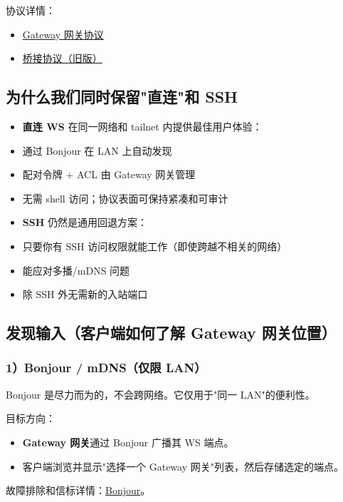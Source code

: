 协议详情：

\begin{itemize}
  \item \href{/gateway/protocol}{Gateway 网关协议}
  \item \href{/gateway/bridge-protocol}{桥接协议（旧版）}
\end{itemize}


\subsection{为什么我们同时保留"直连"和 SSH}


\begin{itemize}
  \item \textbf{直连 WS} 在同一网络和 tailnet 内提供最佳用户体验：
  \item 通过 Bonjour 在 LAN 上自动发现
  \item 配对令牌 + ACL 由 Gateway 网关管理
  \item 无需 shell 访问；协议表面可保持紧凑和可审计
  \item \textbf{SSH} 仍然是通用回退方案：
  \item 只要你有 SSH 访问权限就能工作（即使跨越不相关的网络）
  \item 能应对多播/mDNS 问题
  \item 除 SSH 外无需新的入站端口
\end{itemize}


\subsection{发现输入（客户端如何了解 Gateway 网关位置）}


\subsubsection{1）Bonjour / mDNS（仅限 LAN）}


Bonjour 是尽力而为的，不会跨网络。它仅用于"同一 LAN"的便利性。

目标方向：

\begin{itemize}
  \item \textbf{Gateway 网关}通过 Bonjour 广播其 WS 端点。
  \item 客户端浏览并显示"选择一个 Gateway 网关"列表，然后存储选定的端点。
\end{itemize}


故障排除和信标详情：\href{/gateway/bonjour}{Bonjour}。

